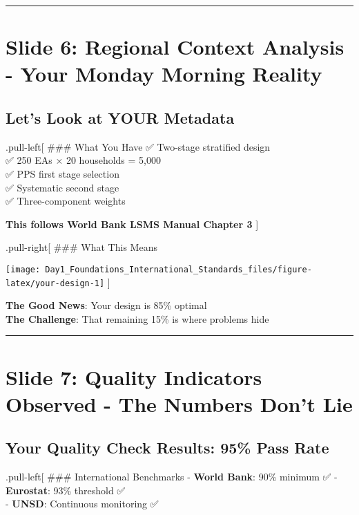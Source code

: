 \documentclass[
]{article}
\begin{document}
\begin{center}\rule{0.5\linewidth}{0.5pt}\end{center}

\section{Slide 6: Regional Context Analysis - Your Monday Morning
Reality}\label{slide-6-regional-context-analysis---your-monday-morning-reality}

\subsection{Let's Look at YOUR
Metadata}\label{lets-look-at-your-metadata}

.pull-left{[} \#\#\# What You Have ✅ Two-stage stratified design\\
✅ 250 EAs × 20 households = 5,000\\
✅ PPS first stage selection\\
✅ Systematic second stage\\
✅ Three-component weights

\textbf{This follows World Bank LSMS Manual Chapter 3} {]}

.pull-right{[} \#\#\# What This Means

\texttt{[image: Day1\_Foundations\_International\_Standards\_files/figure-latex/your-design-1]}
{]}

\textbf{The Good News}: Your design is 85\% optimal\\
\textbf{The Challenge}: That remaining 15\% is where problems hide

\begin{center}\rule{0.5\linewidth}{0.5pt}\end{center}

\section{Slide 7: Quality Indicators Observed - The Numbers Don't
Lie}\label{slide-7-quality-indicators-observed---the-numbers-dont-lie}

\subsection{Your Quality Check Results: 95\% Pass
Rate}\label{your-quality-check-results-95-pass-rate}

.pull-left{[} \#\#\# International Benchmarks - \textbf{World Bank}:
90\% minimum ✅ - \textbf{Eurostat}: 93\% threshold ✅\\
- \textbf{UNSD}: Continuous monitoring ✅
\end{document}
